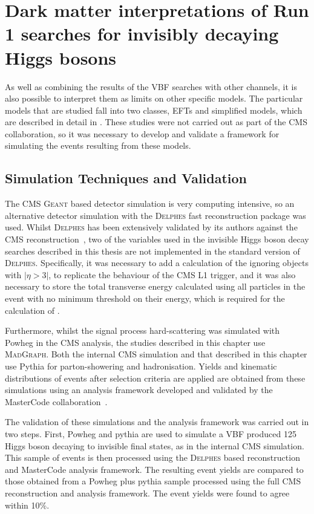\chapter{Dark matter interpretations of Run 1 searches for invisibly decaying Higgs bosons}
\label{chap:interp}
As well as combining the results of the \ac{VBF} searches with other channels, it is also possible to interpret them as limits on other specific models. The particular models that are studied fall into two classes, \ac{EFT}s and simplified models, which are described in detail in . These studies were not carried out as part of the CMS collaboration, so it was necessary to develop and validate a framework for simulating the events resulting from these models.


\section{Simulation Techniques and Validation}
\label{sec:dmval}
The CMS \textsc{Geant} based detector simulation is very computing intensive, so an alternative detector simulation with the \textsc{Delphes} fast reconstruction package was used. Whilst \textsc{Delphes} has been extensively validated by its authors against the CMS reconstruction~\cite{Favereau2014}, two of the variables used in the invisible Higgs boson decay searches described in this thesis are not implemented in the standard version of \textsc{Delphes}. Specifically, it was necessary to add a calculation of the \MET ignoring objects with $|\eta>3|$, to replicate the behaviour of the CMS \ac{L1} trigger, and it was also necessary to store the total transverse energy calculated using all particles in the event with no minimum threshold on their energy, which is required for the calculation of \METsig.

 Furthermore, whilst the signal process hard-scattering was simulated with Powheg in the CMS analysis, the studies described in this chapter use \textsc{MadGraph}. Both the internal CMS simulation and that described in this chapter use Pythia for parton-showering and hadronisation. Yields and kinematic distributions of events after selection criteria are applied are obtained from these simulations using an analysis framework developed and validated by the MasterCode collaboration~\cite{deVries:2015hva}.

The validation of these simulations and the analysis framework was carried out in two steps. First, Powheg and pythia are used to simulate a \ac{VBF} produced 125 \GeV Higgs boson decaying to invisible final states, as in the internal CMS simulation. This sample of events is then processed using the \textsc{Delphes} based reconstruction and MasterCode analysis framework. The resulting event yields are compared to those obtained from a Powheg plus pythia sample processed using the full CMS reconstruction and analysis framework. The event yields were found to agree within 10\%.


